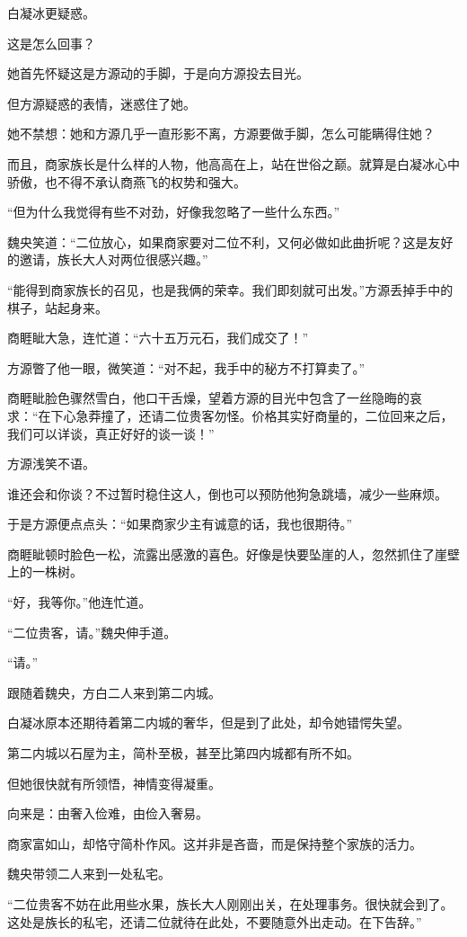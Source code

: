 \begin{this_body}
白凝冰更疑惑。

这是怎么回事？

她首先怀疑这是方源动的手脚，于是向方源投去目光。

但方源疑惑的表情，迷惑住了她。

她不禁想：她和方源几乎一直形影不离，方源要做手脚，怎么可能瞒得住她？

而且，商家族长是什么样的人物，他高高在上，站在世俗之巅。就算是白凝冰心中骄傲，也不得不承认商燕飞的权势和强大。

“但为什么我觉得有些不对劲，好像我忽略了一些什么东西。”

魏央笑道：“二位放心，如果商家要对二位不利，又何必做如此曲折呢？这是友好的邀请，族长大人对两位很感兴趣。”

“能得到商家族长的召见，也是我俩的荣幸。我们即刻就可出发。”方源丢掉手中的棋子，站起身来。

商睚眦大急，连忙道：“六十五万元石，我们成交了！”

方源瞥了他一眼，微笑道：“对不起，我手中的秘方不打算卖了。”

商睚眦脸色骤然雪白，他口干舌燥，望着方源的目光中包含了一丝隐晦的哀求：“在下心急莽撞了，还请二位贵客勿怪。价格其实好商量的，二位回来之后，我们可以详谈，真正好好的谈一谈！”

方源浅笑不语。

谁还会和你谈？不过暂时稳住这人，倒也可以预防他狗急跳墙，减少一些麻烦。

于是方源便点点头：“如果商家少主有诚意的话，我也很期待。”

商睚眦顿时脸色一松，流露出感激的喜色。好像是快要坠崖的人，忽然抓住了崖壁上的一株树。

“好，我等你。”他连忙道。

“二位贵客，请。”魏央伸手道。

“请。”

跟随着魏央，方白二人来到第二内城。

白凝冰原本还期待着第二内城的奢华，但是到了此处，却令她错愕失望。

第二内城以石屋为主，简朴至极，甚至比第四内城都有所不如。

但她很快就有所领悟，神情变得凝重。

向来是：由奢入俭难，由俭入奢易。

商家富如山，却恪守简朴作风。这并非是吝啬，而是保持整个家族的活力。

魏央带领二人来到一处私宅。

“二位贵客不妨在此用些水果，族长大人刚刚出关，在处理事务。很快就会到了。这处是族长的私宅，还请二位就待在此处，不要随意外出走动。在下告辞。”


\end{this_body}
